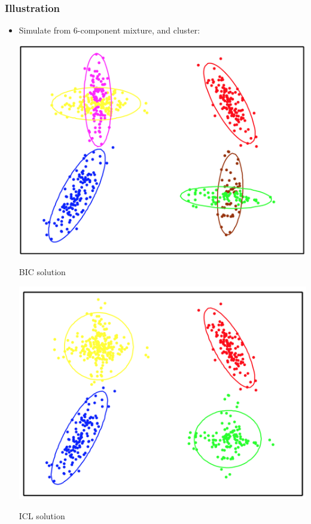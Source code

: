 \documentclass[mathserif,compress]{beamer}
\renewcommand\;{\,}
\begin{document}
\begin{frame}\frametitle{Illustration}
\begin{itemize}
\item
Simulate from 6-component mixture, and cluster:
\medskip
\begin{center}
\begin{minipage}{0.32\linewidth}
\includegraphics[width=\linewidth]{BIC.png}
\begin{center}
BIC solution
\end{center}
\end{minipage}
\hfill
\begin{minipage}{0.32\linewidth}
\includegraphics[width=\linewidth]{ICL.png}
\begin{center}
ICL solution

\end{center}
\end{minipage}
\end{center}
\end{itemize}
\end{frame}
\end{document}
